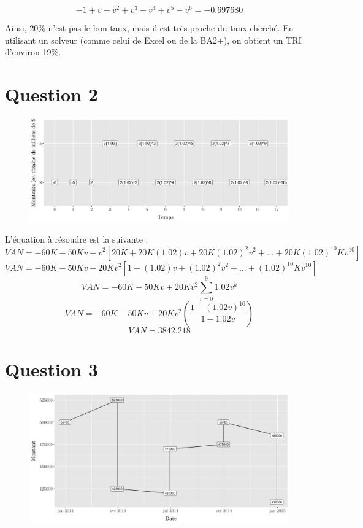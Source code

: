 \documentclass[11pt,french]{article}
\begin{document}
$$
-1 + v - v^2 + v^3 - v^4 + v^5 - v^6 = -0.697 680
$$

Ainsi, 20\% n'est pas le bon taux, mais il est très proche du taux cherché. En utilisant un solveur (comme celui de Excel ou de la BA2+), on obtient un TRI d'environ 19\%.

\section{Question 2}
\begin{figure}[h!] %
    \centering
    \includegraphics[width=1\textwidth]{Figures/figure2.png}
\end{figure}

L'équation à résoudre est la suivante :
$$
VAN = -60K -50Kv + v^2 [20K + 20K(1.02)v + 20K(1.02)^2v^2 + … + 20K(1.02)^{10}Kv^{10}]
$$
$$
VAN = -60K -50Kv + 20Kv^2 [1 + (1.02)v +(1.02)^2v^2 + … + (1.02)^{10}Kv^{10}]
$$
$$
VAN = -60K -50Kv + 20Kv^2 \sum_{i=0}^9 1.02v^k
$$
$$
VAN = -60K -50Kv + 20Kv^2 \left( \frac{1 - (1.02v)^{10}}{1 - 1.02v} \right)
$$
$$
VAN = 3842.218
$$

\section{Question 3}
\begin{figure}[h!] %
    \centering
    \includegraphics[width=1\textwidth]{Figures/figure3.png}
\end{figure}
\end{document}

